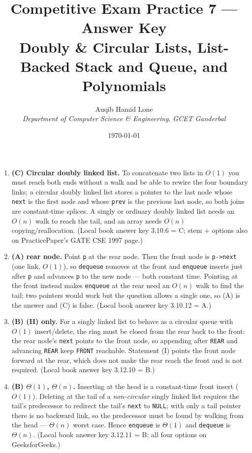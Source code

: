 \documentclass[11pt]{article}
\title{Competitive Exam Practice 7 --- Answer Key\\\large Doubly \& Circular Lists, List-Backed Stack and Queue, and Polynomials}
\author{Auqib Hamid Lone\\[0.3em]
  \emph{Department of Computer Science \& Engineering}, \emph{GCET Ganderbal}}
\date{\today}
\begin{document}
\maketitle

\begin{enumerate}
\item[\textbf{Q1}] \textbf{(C) Circular doubly linked list.} To concatenate two lists in $O(1)$ you must reach both ends without a walk and be able to rewire the four boundary links; a circular doubly linked list stores a pointer to the last node whose \texttt{next} is the first node and whose \texttt{prev} is the previous last node, so both joins are constant-time splices. A singly or ordinary doubly linked list needs an $O(n)$ walk to reach the tail, and an array needs $O(n)$ copying/reallocation. (Local book answer key 3.10.6 = C; stem + options also on PracticePaper's GATE CSE 1997 page.)

\item[\textbf{Q2}] \textbf{(A) rear node.} Point \texttt{p} at the rear node. Then the front node is \texttt{p->next} (one link, $O(1)$), so \texttt{dequeue} removes at the front and \texttt{enqueue} inserts just after \texttt{p} and advances \texttt{p} to the new node --- both constant time. Pointing at the front instead makes \texttt{enqueue} at the rear need an $O(n)$ walk to find the tail; two pointers would work but the question allows a single one, so (A) is the answer and (C) is false. (Local book answer key 3.10.12 = A.)

\item[\textbf{Q3}] \textbf{(B) (II) only.} For a singly linked list to behave as a circular queue with $O(1)$ insert/delete, the ring must be closed from the rear back to the front: the rear node's \texttt{next} points to the front node, so appending after \texttt{REAR} and advancing \texttt{REAR} keep \texttt{FRONT} reachable. Statement (I) points the front node forward at the rear, which does not make the rear reach the front and is not required. (Local book answer key 3.12.10 = B.)

\item[\textbf{Q4}] \textbf{(B) $\Theta(1)$, $\Theta(n)$.} Inserting at the head is a constant-time front insert ($O(1)$). Deleting at the tail of a \emph{non-circular} singly linked list requires the tail's predecessor to redirect the tail's \texttt{next} to \texttt{NULL}; with only a tail pointer there is no backward link, so the predecessor must be found by walking from the head --- $\Theta(n)$ worst case. Hence \texttt{enqueue} is $\Theta(1)$ and \texttt{dequeue} is $\Theta(n)$. (Local book answer key 3.12.11 = B; all four options on GeeksforGeeks.)


\end{enumerate}
\end{document}
